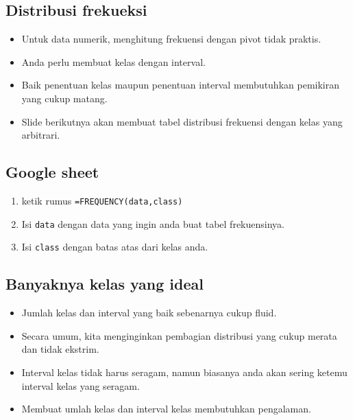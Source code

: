 \documentclass[
  letterpaper,
  DIV=11,
  numbers=noendperiod]{scrartcl}
\providecommand{\tightlist}{%
  \setlength{\itemsep}{0pt}\setlength{\parskip}{0pt}}\usepackage{longtable,booktabs,array}
\begin{document}
\hypertarget{distribusi-frekueksi}{%
\subsection{Distribusi frekueksi}\label{distribusi-frekueksi}}

\begin{itemize}
\item
  Untuk data numerik, menghitung frekuensi dengan pivot tidak praktis.
\item
  Anda perlu membuat kelas dengan interval.
\item
  Baik penentuan kelas maupun penentuan interval membutuhkan pemikiran
  yang cukup matang.
\item
  Slide berikutnya akan membuat tabel distribusi frekuensi dengan kelas
  yang arbitrari.
\end{itemize}

\hypertarget{google-sheet-2}{%
\subsection{Google sheet}\label{google-sheet-2}}

\begin{enumerate}
\def\labelenumi{\arabic{enumi}.}
\tightlist
\item
  ketik rumus \texttt{=FREQUENCY(data,class)}
\item
  Isi \texttt{data} dengan data yang ingin anda buat tabel frekuensinya.
\item
  Isi \texttt{class} dengan batas atas dari kelas anda.
\end{enumerate}

\hypertarget{banyaknya-kelas-yang-ideal}{%
\subsection{Banyaknya kelas yang
ideal}\label{banyaknya-kelas-yang-ideal}}

\begin{itemize}
\item
  Jumlah kelas dan interval yang baik sebenarnya cukup fluid.
\item
  Secara umum, kita menginginkan pembagian distribusi yang cukup merata
  dan tidak ekstrim.
\item
  Interval kelas tidak harus seragam, namun biasanya anda akan sering
  ketemu interval kelas yang seragam.
\item
  Membuat umlah kelas dan interval kelas membutuhkan pengalaman.
\end{itemize}
\end{document}
